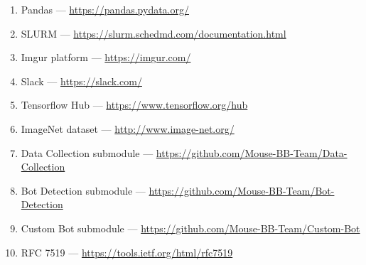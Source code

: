 \begin{enumerate}
    \item Pandas --- \url{https://pandas.pydata.org/}\label{itm:pandas}
    \item SLURM --- \url{https://slurm.schedmd.com/documentation.html}\label{itm:slurm}
    \item Imgur platform --- \url{https://imgur.com/}\label{itm:imgur}
    \item Slack --- \url{https://slack.com/}\label{itm:slack}
    \item Tensorflow Hub --- \url{https://www.tensorflow.org/hub}\label{itm:tensorflow-hub}
    \item ImageNet dataset --- \url{http://www.image-net.org/}\label{itm:image-net}
    \item Data Collection submodule --- \url{https://github.com/Mouse-BB-Team/Data-Collection}\label{itm:data-collection}
    \item Bot Detection submodule --- \url{https://github.com/Mouse-BB-Team/Bot-Detection}\label{itm:bot-detection}
    \item Custom Bot submodule --- \url{https://github.com/Mouse-BB-Team/Custom-Bot}\label{itm:custom-bot}
    \item RFC 7519 --- \url{https://tools.ietf.org/html/rfc7519}\label{itm:rfc-jwt}
\end{enumerate}
\newpage
\thispagestyle{appendix}